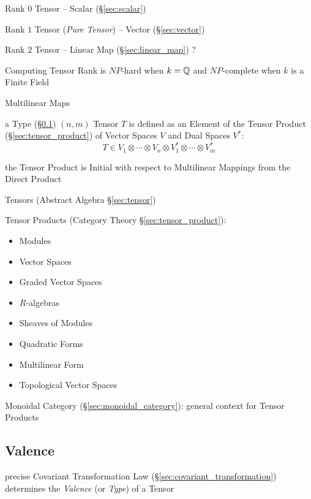 Rank $0$ Tensor -- Scalar (\S\ref{sec:scalar})

Rank $1$ Tensor (\emph{Pure Tensor}) -- Vector (\S\ref{sec:vector})

Rank $2$ Tensor -- Linear Map (\S\ref{sec:linear_map}) ? %

Computing Tensor Rank is $NP$-hard when $k = \mathbb{Q}$ and $NP$-complete
when $k$ is a Finite Field %


\asterism


Multilinear Maps


\asterism


a Type (\S\ref{sec:valence}) $(n,m)$ Tensor $T$ is defined as an
Element of the Tensor Product (\S\ref{sec:tensor_product}) of Vector
Spaces $V$ and Dual Spaces $V^*$:
\[
  T \in V_1 \otimes \cdots \otimes V_n
    \otimes V^*_1 \otimes \cdots \otimes V^*_m
\]

the Tensor Product is Initial with respect to Multilinear Mappings
from the Direct Product

Tensors (Abstract Algebra \S\ref{sec:tensor})

Tensor Products (Category Theory \S\ref{sec:tensor_product}):
\begin{itemize}
  \item Modules
  \item Vector Spaces
  \item Graded Vector Spaces
  \item $R$-algebras
  \item Sheaves of Modules
  \item Quadratic Forms
  \item Multilinear Form
  \item Topological Vector Spaces
\end{itemize}

Monoidal Category (\S\ref{sec:monoidal_category}): general context for
Tensor Products



\subsection{Valence}\label{sec:valence}

precise Covariant Transformation Law
(\S\ref{sec:covariant_transformation}) determines the \emph{Valence}
(or \emph{Type}) of a Tensor


